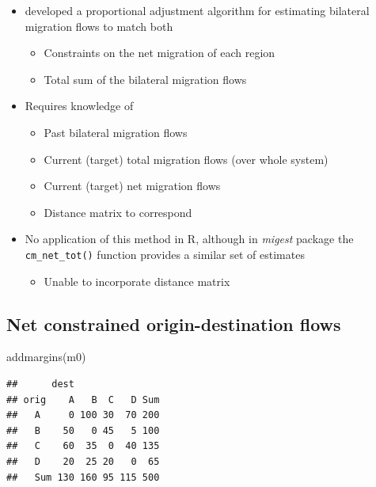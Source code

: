 \documentclass[
]{book}
\newenvironment{Shaded}{\begin{snugshade}}{\end{snugshade}}
\newcommand{\FunctionTok}[1]{\textcolor[rgb]{0.00,0.00,0.00}{#1}}
\newcommand{\NormalTok}[1]{#1}
\providecommand{\tightlist}{%
  \setlength{\itemsep}{0pt}\setlength{\parskip}{0pt}}
\begin{document}
\begin{itemize}
\tightlist
\item
  \citet{Plane1981} developed a proportional adjustment algorithm for estimating bilateral migration flows to match both

  \begin{itemize}
  \tightlist
  \item
    Constraints on the net migration of each region
  \item
    Total sum of the bilateral migration flows
  \end{itemize}
\item
  Requires knowledge of

  \begin{itemize}
  \tightlist
  \item
    Past bilateral migration flows
  \item
    Current (target) total migration flows (over whole
    system)
  \item
    Current (target) net migration flows
  \item
    Distance matrix to correspond
  \end{itemize}
\item
  No application of this method in R, although in \emph{migest} package the \texttt{cm\_net\_tot()} function provides a similar set of estimates

  \begin{itemize}
  \tightlist
  \item
    Unable to incorporate distance matrix
  \end{itemize}
\end{itemize}

\hypertarget{net-constrained-origin-destination-flows-1}{%
\subsection{Net constrained origin-destination flows}\label{net-constrained-origin-destination-flows-1}}

\begin{Shaded}
\begin{Highlighting}[]
\FunctionTok{addmargins}\NormalTok{(m0)}
\end{Highlighting}
\end{Shaded}

\begin{verbatim}
##      dest
## orig    A   B  C   D Sum
##   A     0 100 30  70 200
##   B    50   0 45   5 100
##   C    60  35  0  40 135
##   D    20  25 20   0  65
##   Sum 130 160 95 115 500
\end{verbatim}
\end{document}
